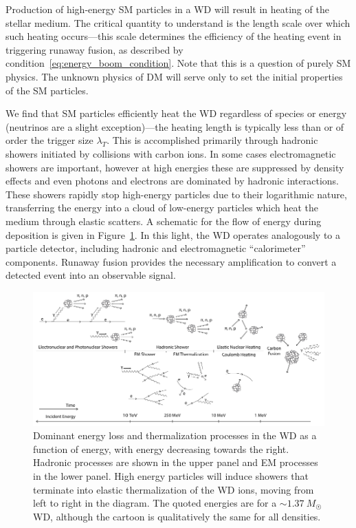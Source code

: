 Production of high-energy SM particles in a WD will result in heating of the stellar medium.
The critical quantity to understand is the length scale over which such heating occurs---this scale determines the efficiency of the heating event in triggering runaway fusion, as described by condition~\eqref{eq:energy_boom_condition}.
Note that this is a question of purely SM physics.
The unknown physics of DM will serve only to set the initial properties of the SM particles.

We find that SM particles efficiently heat the WD regardless of species or energy (neutrinos are a slight exception)---the heating length is typically less than or of order the trigger size $\lambda_T$.
This is accomplished primarily through hadronic showers initiated by collisions with carbon ions.
In some cases electromagnetic showers are important, however at high energies these are suppressed by density effects and even photons and electrons are dominated by hadronic interactions.
These showers rapidly stop high-energy particles due to their logarithmic nature, transferring the energy into a cloud of low-energy particles which heat the medium through elastic scatters.
A schematic for the flow of energy during deposition is given in Figure~\ref{fig:cooling-cartoon}.
In this light, the WD operates analogously to a particle detector, including hadronic and electromagnetic ``calorimeter'' components.
Runaway fusion provides the necessary amplification to convert a detected event into an observable signal.

\begin{figure}
\includegraphics[scale=1.0]{cooling-cartoon.pdf}
\caption{Dominant energy loss and thermalization processes in the WD as a function of energy, with energy decreasing towards the right.
Hadronic processes are shown in the upper panel and EM processes in the lower panel.
High energy particles will induce showers that terminate into elastic thermalization of the WD ions, moving from left to right in the diagram.
The quoted energies are for a $\sim 1.37 ~M_{\astrosun}$ WD, although the cartoon is qualitatively the same for all densities.}
\label{fig:cooling-cartoon}
\end{figure}


